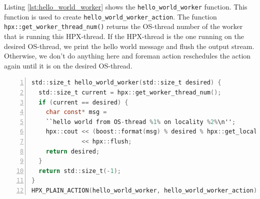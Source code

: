 Listing \ref{lst:hello_world_worker} shows the \verb|hello_world_worker| function. This function is used to create \verb|hello_world_worker_action|. The function \verb|hpx::get_worker_thread_num()| returns the OS-thread number of the worker that is running this HPX-thread. If the HPX-thread is the one running on the desired OS-thread, we print the hello world message and flush the output stream. Otherwise, we don't do anything here and foreman action reschedules the action again until it is on the desired OS-thread.

\begin{lstlisting}[language=C, frame=single, numbers=left, basicstyle=\footnotesize, caption=Hello World Worker\label{lst:hello_world_worker}]
std::size_t hello_world_worker(std::size_t desired) {
  std::size_t current = hpx::get_worker_thread_num();
  if (current == desired) {
    char const* msg =
    ``hello world from OS-thread %1% on locality %2%\n'';
    hpx::cout << (boost::format(msg) % desired % hpx::get_locality_id())
              << hpx::flush;
    return desired;
  }
  return std::size_t(-1);
}
HPX_PLAIN_ACTION(hello_world_worker, hello_world_worker_action);
\end{lstlisting}

